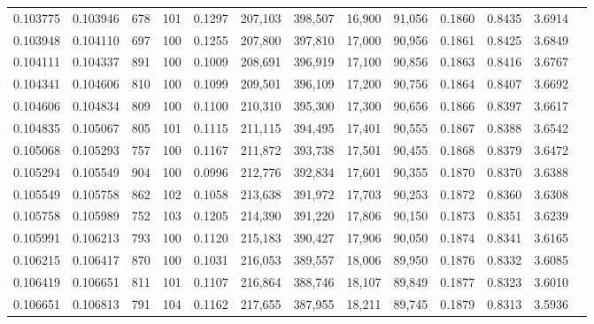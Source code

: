 \begin{tabular}{rrrrrrrrrrrrr}
0.103775 & 0.103946 &   678 & 101 &                                     0.1297 & 207,103 & 398,507 &  16,900 &  91,056 & 0.1860 & 0.8435 & 3.6914 \\
0.103948 & 0.104110 &   697 & 100 &                                     0.1255 & 207,800 & 397,810 &  17,000 &  90,956 & 0.1861 & 0.8425 & 3.6849 \\
0.104111 & 0.104337 &   891 & 100 &                                     0.1009 & 208,691 & 396,919 &  17,100 &  90,856 & 0.1863 & 0.8416 & 3.6767 \\
0.104341 & 0.104606 &   810 & 100 &                                     0.1099 & 209,501 & 396,109 &  17,200 &  90,756 & 0.1864 & 0.8407 & 3.6692 \\
0.104606 & 0.104834 &   809 & 100 &                                     0.1100 & 210,310 & 395,300 &  17,300 &  90,656 & 0.1866 & 0.8397 & 3.6617 \\
0.104835 & 0.105067 &   805 & 101 &                                     0.1115 & 211,115 & 394,495 &  17,401 &  90,555 & 0.1867 & 0.8388 & 3.6542 \\
0.105068 & 0.105293 &   757 & 100 &                                     0.1167 & 211,872 & 393,738 &  17,501 &  90,455 & 0.1868 & 0.8379 & 3.6472 \\
0.105294 & 0.105549 &   904 & 100 &                                     0.0996 & 212,776 & 392,834 &  17,601 &  90,355 & 0.1870 & 0.8370 & 3.6388 \\
0.105549 & 0.105758 &   862 & 102 &                                     0.1058 & 213,638 & 391,972 &  17,703 &  90,253 & 0.1872 & 0.8360 & 3.6308 \\
0.105758 & 0.105989 &   752 & 103 &                                     0.1205 & 214,390 & 391,220 &  17,806 &  90,150 & 0.1873 & 0.8351 & 3.6239 \\
0.105991 & 0.106213 &   793 & 100 &                                     0.1120 & 215,183 & 390,427 &  17,906 &  90,050 & 0.1874 & 0.8341 & 3.6165 \\
0.106215 & 0.106417 &   870 & 100 &                                     0.1031 & 216,053 & 389,557 &  18,006 &  89,950 & 0.1876 & 0.8332 & 3.6085 \\
0.106419 & 0.106651 &   811 & 101 &                                     0.1107 & 216,864 & 388,746 &  18,107 &  89,849 & 0.1877 & 0.8323 & 3.6010 \\
0.106651 & 0.106813 &   791 & 104 &                                     0.1162 & 217,655 & 387,955 &  18,211 &  89,745 & 0.1879 & 0.8313 & 3.5936 \\

\end{tabular}
